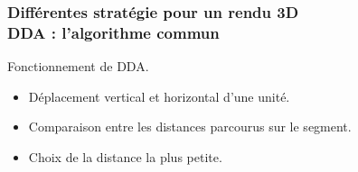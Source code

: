 \documentclass{beamer}
\begin{document}
\begin{frame}
    \frametitle{Différentes stratégie pour un rendu 3D \\
                \small DDA : l'algorithme commun}           
    \begin{block}{Fonctionnement de DDA.}
        \begin{itemize}
            \item Déplacement vertical et horizontal d'une unité.
            \item Comparaison entre les distances parcourus sur le segment.
            \item Choix de la distance la plus petite.
        \end{itemize}
    \end{block}
    \begin{figure}
        \centering
\end{figure}
\end{frame}
\end{document}
